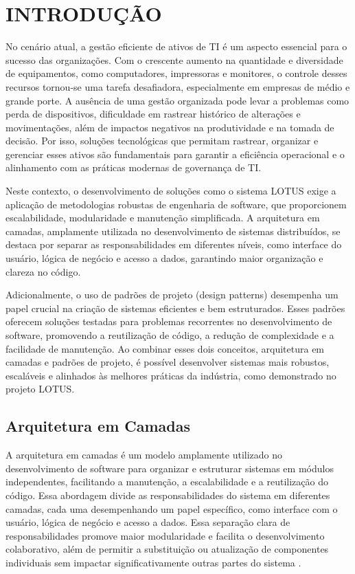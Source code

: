 \chapter{INTRODUÇÃO}

No cenário atual, a gestão eficiente de ativos de TI é um aspecto essencial para o sucesso das organizações. Com o crescente aumento na quantidade e diversidade de equipamentos, como computadores, impressoras e monitores, o controle desses recursos tornou-se uma tarefa desafiadora, especialmente em empresas de médio e grande porte. A ausência de uma gestão organizada pode levar a problemas como perda de dispositivos, dificuldade em rastrear histórico de alterações e movimentações, além de impactos negativos na produtividade e na tomada de decisão. Por isso, soluções tecnológicas que permitam rastrear, organizar e gerenciar esses ativos são fundamentais para garantir a eficiência operacional e o alinhamento com as práticas modernas de governança de TI.

Neste contexto, o desenvolvimento de soluções como o sistema LOTUS exige a aplicação de metodologias robustas de engenharia de software, que proporcionem escalabilidade, modularidade e manutenção simplificada. A arquitetura em camadas, amplamente utilizada no desenvolvimento de sistemas distribuídos, se destaca por separar as responsabilidades em diferentes níveis, como interface do usuário, lógica de negócio e acesso a dados, garantindo maior organização e clareza no código.

Adicionalmente, o uso de padrões de projeto (design patterns) desempenha um papel crucial na criação de sistemas eficientes e bem estruturados. Esses padrões oferecem soluções testadas para problemas recorrentes no desenvolvimento de software, promovendo a reutilização de código, a redução de complexidade e a facilidade de manutenção. Ao combinar esses dois conceitos, arquitetura em camadas e padrões de projeto, é possível desenvolver sistemas mais robustos, escaláveis e alinhados às melhores práticas da indústria, como demonstrado no projeto LOTUS.

\section{Arquitetura em Camadas}

A arquitetura em camadas é um modelo amplamente utilizado no desenvolvimento de software para organizar e estruturar sistemas em módulos independentes, facilitando a manutenção, a escalabilidade e a reutilização do código. Essa abordagem divide as responsabilidades do sistema em diferentes camadas, cada uma desempenhando um papel específico, como interface com o usuário, lógica de negócio e acesso a dados. Essa separação clara de responsabilidades promove maior modularidade e facilita o desenvolvimento colaborativo, além de permitir a substituição ou atualização de componentes individuais sem impactar significativamente outras partes do sistema \cite{bass2003}.

